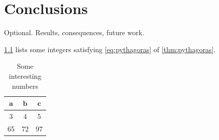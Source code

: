 \documentclass[a4paper, article, oneside, UKenglish]{memoir}
\newcommand{\0}{\mathbf{0}}
\newcommand{\1}{\mathbf{1}}
\begin{document}
\chapter{Conclusions}


Optional. Results, consequences, future work.

\cref{tab:numbers} lists some integers satisfying \cref{eq:pythagoras} of \cref{thm:pythagoras}.

\begin{table}[htbp]
    \centering
    \begin{tabular}{@{}ccc@{}}
        \toprule
        \(\boldsymbol{a}\) & \(\boldsymbol{b}\) & \(\boldsymbol{c}\)
        \\
        \midrule
        3 & 4 & 5
        \\
        65 & 72 & 97
        \\
        \bottomrule
    \end{tabular}
    \caption{Some interesting numbers}
    \label{tab:numbers}
\end{table}


\printbibliography
\end{document}
